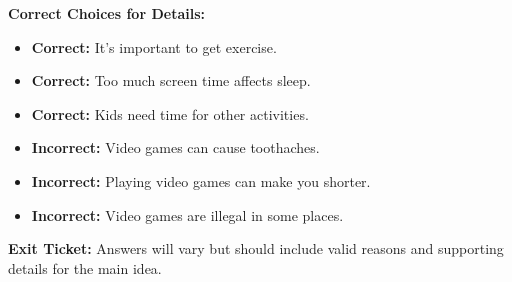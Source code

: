 \documentclass[12pt]{article}
\begin{document}
\textbf{Correct Choices for Details:}
\begin{itemize}
    \item \textbf{Correct:} It’s important to get exercise.
    \item \textbf{Correct:} Too much screen time affects sleep.
    \item \textbf{Correct:} Kids need time for other activities.
    \item \textbf{Incorrect:} Video games can cause toothaches.
    \item \textbf{Incorrect:} Playing video games can make you shorter.
    \item \textbf{Incorrect:} Video games are illegal in some places.
\end{itemize}

\textbf{Exit Ticket:} Answers will vary but should include valid reasons and supporting details for the main idea.
\end{document}
